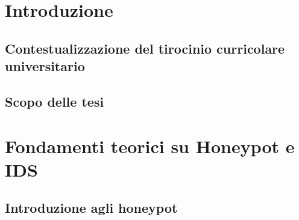 \documentclass[12pt,a4paper,oneside,onecolumn,openright]{book}
\begin{document}
\tableofcontents

\chapter{Introduzione}
\section{Contestualizzazione del tirocinio curricolare universitario}
\section{Scopo delle tesi}


\chapter{Fondamenti teorici su Honeypot e IDS}
\section{Introduzione agli honeypot}
\end{document}
